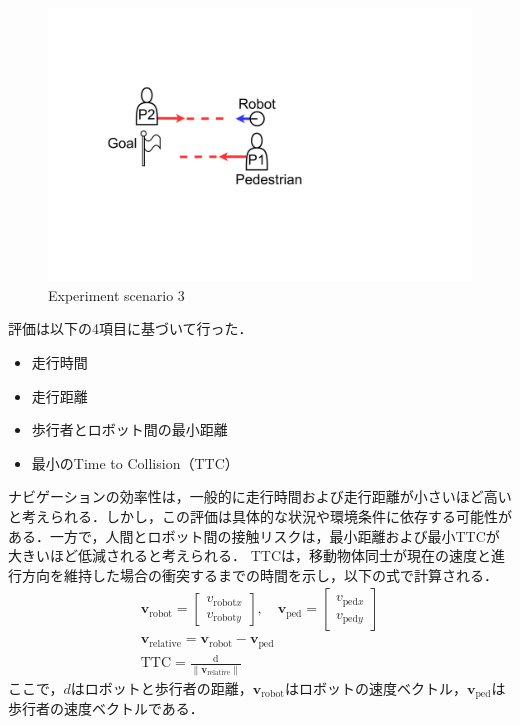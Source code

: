 \begin{figure}[H]
  \centering
  \includegraphics[keepaspectratio, scale=0.15]{images/scenario3.pdf}
  \caption{Experiment scenario 3}
  \label{Fig:scenario3}
\end{figure}


評価は以下の4項目に基づいて行った．
\begin{itemize}
  \item 走行時間
  \item 走行距離
  \item 歩行者とロボット間の最小距離
  \item 最小のTime to Collision（TTC）
\end{itemize}

ナビゲーションの効率性は，一般的に走行時間および走行距離が小さいほど高いと考えられる．しかし，この評価は具体的な状況や環境条件に依存する可能性がある．一方で，人間とロボット間の接触リスクは，最小距離および最小TTCが大きいほど低減されると考えられる．
TTCは，移動物体同士が現在の速度と進行方向を維持した場合の衝突するまでの時間を示し，以下の式で計算される．
\setlength{\jot}{1em}
\begin{align}
  \mathbf{v}_{\text{robot}} = \begin{bmatrix} v_{\text{robot}x} \\ v_{\text{robot}y} \end{bmatrix}, \quad 
  \mathbf{v}_{\text{ped}} = \begin{bmatrix} v_{\text{ped}x} \\ v_{\text{ped}y} \end{bmatrix} \\
  \mathbf{v}_{\text{relative}} = \mathbf{v}_{\text{robot}} - \mathbf{v}_{\text{ped}} \\
  \text{TTC} = \frac{\text{d}}{\|\mathbf{v}_{\text{relative}}\|}
\end{align}
ここで，$d$はロボットと歩行者の距離，$\mathbf{v}_{\text{robot}}$はロボットの速度ベクトル，$\mathbf{v}_{\text{ped}}$は歩行者の速度ベクトルである．

